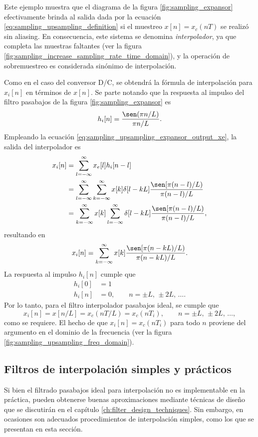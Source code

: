 \documentclass[a4paper]{report}
\begin{document}
Este ejemplo muestra que el diagrama de la figura \ref{fig:sampling_expansor} efectivamente brinda al salida dada por la ecuación \ref{eq:sampling_upsampling_definition} si el muestreo \(x[n]=x_c(nT)\) se realizó sin aliasing. En consecuencia, este sistema se denomina \emph{interpolador}, ya que completa las muestras faltantes (ver la figura \ref{fig:sampling_increase_sampling_rate_time_domain}), y la operación de sobremuestreo es considerada sinónimo de interpolación.

Como en el caso del conversor D/C, se obtendrá la fórmula de interpolación para \(x_i[n]\) en términos de \(x[n]\). Se parte notando que la respuesta al impulso del filtro pasabajos de la figura \ref{fig:sampling_expansor} es
\[
 h_i[n]=\frac{\sen(\pi n/L)}{\pi n/L}.
\]
Empleando la ecuación \ref{eq:sampling_upsampling_expansor_output_xe}, la salida del interpolador es
\begin{align*}
 x_i[n]&=\sum_{l=-\infty}^{\infty}x_e[l]h_i[n-l]\\
  &=\sum_{l=-\infty}^{\infty}\sum_{k=-\infty}^{\infty}x[k]\delta[l-kL]\frac{\sen[\pi(n-l)/L)}{\pi(n-l)/L}\\
  &=\sum_{k=-\infty}^{\infty}x[k]\sum_{l=-\infty}^{\infty}\delta[l-kL]\frac{\sen[\pi(n-l)/L)}{\pi(n-l)/L},
\end{align*}
resultando en
\[
 x_i[n]=\sum_{k=-\infty}^{\infty}x[k]\frac{\sen[\pi(n-kL)/L)}{\pi(n-kL)/L}.
\]
La respuesta al impulso \(h_i[n]\) cumple que
\begin{align*}
 h_i[0]&=1\\
 h_i[n]&=0,\qquad n=\pm L,\,\pm2L,\,\dots. 
\end{align*}
Por lo tanto, para el filtro interpolador pasabajos ideal, se cumple que 
\[
 x_i[n]=x[n/L]=x_c(nT/L)=x_c(nT_i),\qquad n=\pm L,\,\pm2L,\,\dots,
\]
como se requiere. El hecho de que \(x_i[n]=x_c(nT_i)\) para todo \(n\) proviene del argumento en el dominio de la frecuencia (ver la figura \ref{fig:sampling_upsampling_freq_domain}).

\subsection{Filtros de interpolación simples y prácticos}

Si bien el filtrado pasabajos ideal para interpolación no es implementable en la práctica, pueden obtenerse buenas aproximaciones mediante técnicas de diseño que se discutirán en el capítulo \ref{ch:filter_design_techniques}. Sin embargo, en ocasiones son adecuados procedimientos de interpolación simples, como los que se presentan en esta sección.
\end{document}
